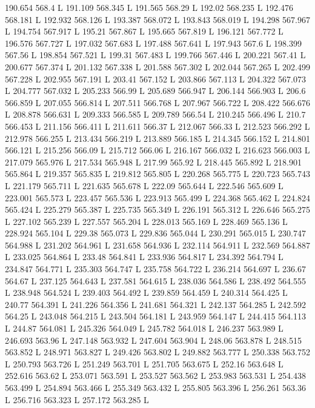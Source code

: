 190.654 568.4 L
191.109 568.345 L
191.565 568.29 L
192.02 568.235 L
192.476 568.181 L
192.932 568.126 L
193.387 568.072 L
193.843 568.019 L
194.298 567.967 L
194.754 567.917 L
195.21 567.867 L
195.665 567.819 L
196.121 567.772 L
196.576 567.727 L
197.032 567.683 L
197.488 567.641 L
197.943 567.6 L
198.399 567.56 L
198.854 567.521 L
199.31 567.483 L
199.766 567.446 L
200.221 567.41 L
200.677 567.374 L
201.132 567.338 L
201.588 567.302 L
202.044 567.265 L
202.499 567.228 L
202.955 567.191 L
203.41 567.152 L
203.866 567.113 L
204.322 567.073 L
204.777 567.032 L
205.233 566.99 L
205.689 566.947 L
206.144 566.903 L
206.6 566.859 L
207.055 566.814 L
207.511 566.768 L
207.967 566.722 L
208.422 566.676 L
208.878 566.631 L
209.333 566.585 L
209.789 566.54 L
210.245 566.496 L
210.7 566.453 L
211.156 566.411 L
211.611 566.37 L
212.067 566.33 L
212.523 566.292 L
212.978 566.255 L
213.434 566.219 L
213.889 566.185 L
214.345 566.152 L
214.801 566.121 L
215.256 566.09 L
215.712 566.06 L
216.167 566.032 L
216.623 566.003 L
217.079 565.976 L
217.534 565.948 L
217.99 565.92 L
218.445 565.892 L
218.901 565.864 L
219.357 565.835 L
219.812 565.805 L
220.268 565.775 L
220.723 565.743 L
221.179 565.711 L
221.635 565.678 L
222.09 565.644 L
222.546 565.609 L
223.001 565.573 L
223.457 565.536 L
223.913 565.499 L
224.368 565.462 L
224.824 565.424 L
225.279 565.387 L
225.735 565.349 L
226.191 565.312 L
226.646 565.275 L
227.102 565.239 L
227.557 565.204 L
228.013 565.169 L
228.469 565.136 L
228.924 565.104 L
229.38 565.073 L
229.836 565.044 L
230.291 565.015 L
230.747 564.988 L
231.202 564.961 L
231.658 564.936 L
232.114 564.911 L
232.569 564.887 L
233.025 564.864 L
233.48 564.841 L
233.936 564.817 L
234.392 564.794 L
234.847 564.771 L
235.303 564.747 L
235.758 564.722 L
236.214 564.697 L
236.67 564.67 L
237.125 564.643 L
237.581 564.615 L
238.036 564.586 L
238.492 564.555 L
238.948 564.524 L
239.403 564.492 L
239.859 564.459 L
240.314 564.425 L
240.77 564.391 L
241.226 564.356 L
241.681 564.321 L
242.137 564.285 L
242.592 564.25 L
243.048 564.215 L
243.504 564.181 L
243.959 564.147 L
244.415 564.113 L
244.87 564.081 L
245.326 564.049 L
245.782 564.018 L
246.237 563.989 L
246.693 563.96 L
247.148 563.932 L
247.604 563.904 L
248.06 563.878 L
248.515 563.852 L
248.971 563.827 L
249.426 563.802 L
249.882 563.777 L
250.338 563.752 L
250.793 563.726 L
251.249 563.701 L
251.705 563.675 L
252.16 563.648 L
252.616 563.62 L
253.071 563.591 L
253.527 563.562 L
253.983 563.531 L
254.438 563.499 L
254.894 563.466 L
255.349 563.432 L
255.805 563.396 L
256.261 563.36 L
256.716 563.323 L
257.172 563.285 L
